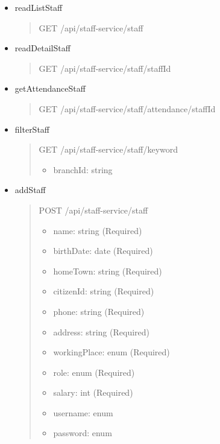 \begin{itemize}
	\item readListStaff
	\begin{quote}
		GET /api/staff-service/staff
	\end{quote}

	\item readDetailStaff
	\begin{quote}
		GET /api/staff-service/staff/{staffId}
	\end{quote}

	\item getAttendanceStaff
	\begin{quote}
		GET /api/staff-service/staff/attendance/{staffId}
	\end{quote}

	\item filterStaff
	\begin{quote}
		GET /api/staff-service/staff/{keyword}
		\begin{itemize}
			\item branchId: string
		\end{itemize}
	\end{quote}

	\item addStaff
	\begin{quote}
		POST /api/staff-service/staff
		\begin{itemize}
			\item name: string (Required)
			\item birthDate: date (Required)
			\item homeTown: string (Required)
			\item citizenId: string (Required)
			\item phone: string (Required)
			\item address: string (Required)
			\item workingPlace: enum (Required)
			\item role: enum (Required)
			\item salary: int (Required)
			\item username: enum
			\item password: enum
		\end{itemize}
	\end{quote}


\end{itemize}

